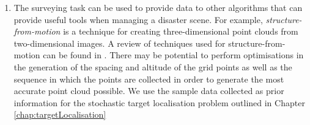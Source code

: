 \begin{enumerate}
    \item The surveying task can be used to provide data to other algorithms that can provide useful tools when managing a disaster scene. For example, \textit{structure-from-motion} is a technique for creating three-dimensional point clouds from two-dimensional images. A review of techniques used for structure-from-motion can be found in \cite{Bianco2018EvaluatingPipelines}. There may be potential to perform optimisations in the generation of the spacing and altitude of the grid points as well as the sequence in which the points are collected in order to generate the most accurate point cloud possible. We use the sample data collected as prior information for the stochastic target localisation problem outlined in Chapter \ref{chap:targetLocalisation}
    
    
\end{enumerate}

























